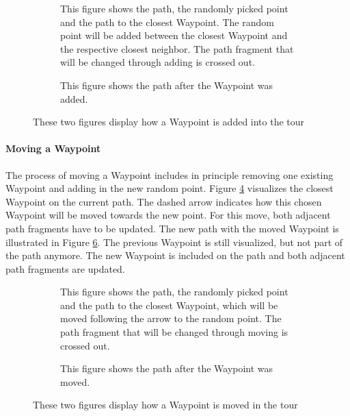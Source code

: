 \begin{figure}
	\begin{subfigure}[t]{0.48\textwidth}
		\centering
		
		\caption{This figure shows the path, the randomly picked point and the path to the closest Waypoint.
			The random point will be added between the closest Waypoint and the respective closest neighbor.
			The path fragment that will be changed through adding is crossed out.}
		\label{fig:shortestPathAndAdd}
	\end{subfigure}
	\hfill
	\begin{subfigure}[t]{0.48\textwidth}
		\centering
		
		\caption{This figure shows the path after the Waypoint was added.}
		\label{fig:shortestPathAndAddDone}
	\end{subfigure}
	\caption{These two figures display how a Waypoint is added into the tour}
\end{figure}
	

\paragraph{Moving a Waypoint}	
The process of moving a Waypoint includes in principle removing one existing Waypoint and adding in the new random point. 
Figure \ref{fig:shortestPahtAndMove} visualizes the closest Waypoint on the current path.
The dashed arrow indicates how this chosen Waypoint will be moved towards the new point.
For this move, both adjacent path fragments have to be updated.
The new path with the moved Waypoint is illustrated in Figure \ref{fig:shortestPathAndMoveDone}.
The previous Waypoint is still visualized, but not part of the path anymore.
The new Waypoint is included on the path and both adjacent path fragments are updated.
	

\begin{figure}
	\begin{subfigure}[t]{0.48\textwidth}
		\centering
		
		\caption{This figure shows the path, the randomly picked point and the path to the closest Waypoint, which will be moved following the arrow to the random point.
			The path fragment that will be changed through moving is crossed out.}
		\label{fig:shortestPahtAndMove}
		\end{subfigure}
		\hfill
		\begin{subfigure}[t]{0.48\textwidth}
		\centering
		
		\caption{This figure shows the path after the Waypoint was moved.}
		\label{fig:shortestPathAndMoveDone}
		\end{subfigure}
		\caption{These two figures display how a Waypoint is moved in the tour}
	\end{figure}
	

